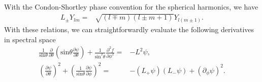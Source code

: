 \documentclass[%
 prd,
amsmath,amssymb,
preprint,%
]{revtex4-1}
\begin{document}
With the Condon-Shortley phase convention for the spherical harmonics, we have
\begin{align}
   L_{\pm}Y_{lm}
   =&
   \sqrt{(l\mp m)(l\pm m+1)}Y_{l (m\pm1)}
   .
\end{align}
With these relations, we can straightforwardly evaluate
the following derivatives in spectral space
\begin{subequations}
\begin{align}
   \frac{1}{\mathrm{sin}\theta}
   \frac{\partial}{\partial\theta}
   \left(
      \mathrm{sin}\theta\frac{\partial\psi}{\partial\theta}
   \right)
   +
   \frac{1}{\mathrm{sin}^2\theta}
   \frac{\partial^2f}{\partial\phi^2}
   =&
   -
   L^2\psi
   ,\\
   \left(\frac{\partial\psi}{\partial\theta}\right)^2
   +
   \left(
      \frac{1}{\mathrm{sin}\theta}
      \frac{\partial\psi}{\partial\phi}
   \right)^2
   =&
   -
   \left(L_+\psi\right)\left(L_-\psi\right)
   +
   \left(\partial_{\phi}\psi\right)^2
   .
\end{align}
\end{subequations}

\end{document}
